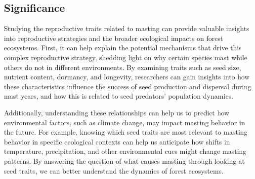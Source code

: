 \documentclass[11pt,letter]{article}
\begin{document}
\subsection{Significance} 
Studying the reproductive traits related to masting can provide valuable insights into reproductive strategies and the broader ecological impacts on forest ecosystems. First, it can help explain the potential mechanisms that drive this complex reproductive strategy, shedding light on why certain species mast while others do not in different environments. By examining traits such as seed size, nutrient content, dormancy, and longevity, researchers can gain insights into how these characteristics influence the success of seed production and dispersal during mast years, and how this is related to seed predators' population dynamics.\par
Additionally, understanding these relationships can help us to predict how environmental factors, such as climate change, may impact masting behavior in the future. For example, knowing which seed traits are most relevant to masting behavior in specific ecological contexts can help us anticipate how shifts in temperature, precipitation, and other environmental cues might change masting patterns. By answering the question of what causes masting through looking at seed traits, we can better understand the dynamics of forest ecosystems.\par
\end{document}
